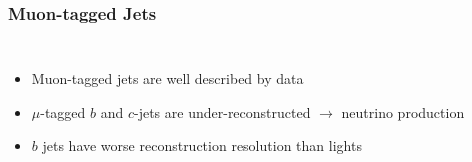 \begin{frame}

  \frametitle{\textbf{Muon-tagged Jets}}

  \begin{columns}
    \centering
    \begin{itemize}
    \item Muon-tagged jets are well described by data
    \item $\mu$-tagged $b$ and $c$-jets are under-reconstructed $\to$ neutrino production
    \item $b$ jets have worse reconstruction resolution than lights
    \end{itemize}
  \end{columns}

  \begin{columns}
    \centering
  \end{columns}





\end{frame}
